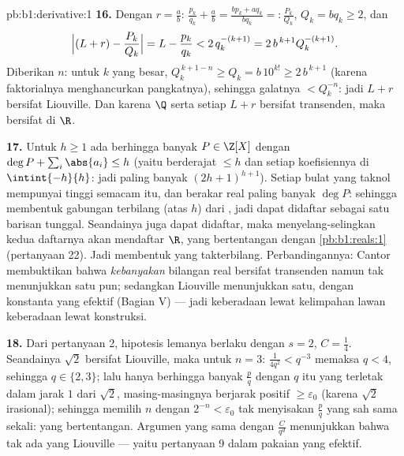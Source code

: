 \begin{solution}{pb:b1:derivative:1}
\textbf{16.} Dengan $r = \frac ab$: $\frac{p_k}{q_k} + \frac ab =
\frac{b p_k + a q_k}{b q_k} =: \frac{P_k}{Q_k}$, $Q_k = b q_k
\geq 2$, dan
\[
\Bigl|(L + r) - \frac{P_k}{Q_k}\Bigr| = L - \frac{p_k}{q_k}
< 2\,q_k^{-(k+1)} = 2\,b^{\,k+1} Q_k^{-(k+1)} .
\]
Diberikan $n$: untuk $k$ yang besar, $Q_k^{\,k+1-n} \geq Q_k = b\,10^{k!}
\geq 2\,b^{\,k+1}$ (karena faktorialnya menghancurkan pangkatnya), sehingga
galatnya $< Q_k^{-n}$: jadi $L + r$ bersifat Liouville. Dan karena $\Q$ 
serta setiap $L + r$ bersifat transenden, maka 
bersifat  di $\R$.

\textbf{17.} Untuk $h \geq 1$ ada berhingga banyak $P \in
\Z[X]$ dengan $\deg P + \sum_i \abs{a_i} \leq h$ (yaitu berderajat $\leq h$
dan setiap koefisiennya di $\intint{-h}{h}$: jadi paling banyak
$(2h+1)^{h+1}$). Setiap  bulat yang taknol mempunyai
tinggi semacam itu, dan berakar real paling banyak $\deg P$: sehingga  membentuk gabungan terbilang (atas $h$) dari , jadi
dapat didaftar sebagai satu barisan tunggal. Seandainya  juga
dapat didaftar, maka menyelang-selingkan kedua daftarnya akan mendaftar $\R$,
yang bertentangan dengan \cref{pb:b1:reals:1} (pertanyaan 22). Jadi
 membentuk  yang takterbilang. Perbandingannya:
Cantor membuktikan bahwa \emph{kebanyakan} bilangan real bersifat transenden namun tak menunjukkan
satu pun; sedangkan Liouville menunjukkan satu, dengan konstanta yang efektif (Bagian V)
--- jadi keberadaan lewat kelimpahan lawan keberadaan lewat konstruksi.

\textbf{18.} Dari pertanyaan 2, hipotesis lemanya berlaku dengan $s
= 2$, $C = \frac14$. Seandainya $\sqrt2$ bersifat Liouville, maka untuk $n =
3$: $\frac{1}{4q^2} < q^{-3}$ memaksa $q < 4$, sehingga $q \in \{2,
3\}$; lalu hanya berhingga banyak $\frac pq$ dengan $q$ itu yang terletak dalam jarak
$1$ dari $\sqrt2$, masing-masingnya berjarak positif
$\geq \varepsilon_0$ (karena $\sqrt2$ irasional); sehingga memilih $n$ dengan
$2^{-n} < \varepsilon_0$ tak menyisakan $\frac pq$ yang sah sama sekali:
yang bertentangan. Argumen yang sama dengan $\frac{C}{q^d}$ menunjukkan bahwa tak ada
 yang Liouville --- yaitu pertanyaan 9 dalam pakaian yang
efektif.


\end{solution}
